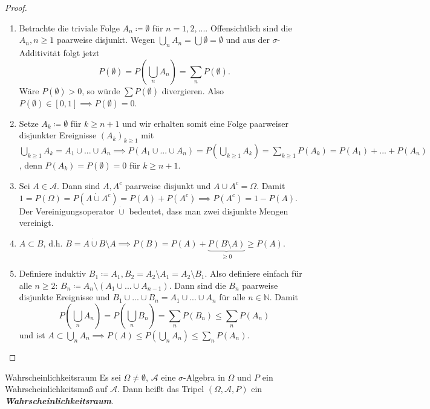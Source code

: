 \documentclass[a4paper, landscape,twocolumn,fontsize=9pt]{scrartcl}
\newcommand{\vip}[1]{\textit{\textbf{#1}}}
\begin{document}
\begin{proof}
\begin{enumerate}
	\item Betrachte die triviale Folge $A_n \coloneqq \emptyset$ für $n= 1,2,...$. Offensichtlich sind die $A_n, n \geq 1$ paarweise disjunkt. Wegen $\bigcup_n A_n = \bigcup \emptyset = \emptyset$ und aus der $\sigma$-Additivität folgt jetzt
\[
	P(\emptyset) = P(\bigcup_n A_n) = \sum_{n} P(\emptyset).
\]
Wäre $P(\emptyset) > 0$, so würde $\sum P(\emptyset)$ divergieren. Also $P(\emptyset) \in [0,1] \implies P(\emptyset) = 0$.

\item Setze $A_k \coloneqq \emptyset$ für $k \geq n + 1$ und wir erhalten somit eine Folge paarweiser disjunkter Ereignisse $(A_k)_{k \geq 1}$ mit $\bigcup_{k \geq 1}A_k = A_1 \cup ... \cup A_n \implies P(A_1 \cup ... \cup A_n) = P(\bigcup_{k \geq 1}A_k) = \sum_{k \geq 1}P(A_k) = P(A_1) + ... + P(A_n)$,  denn $P(A_k) = P(\emptyset) = 0$ für $k \geq n+1$.

\item Sei $A \in \mathcal A$. Dann sind $A,A^c$ paarweise disjunkt und $A \cup A^c = \Omega$. Damit $1 = P(\Omega) = P(A \dot \cup A^c) = P(A) + P(A^c) \implies P(A^c) = 1 - P(A)$. Der Vereinigungsoperator $\dot \cup$ bedeutet, dass man zwei disjunkte Mengen vereinigt.

\item $A \subset B$, d.h. $B = A \dot \cup B \setminus A \implies P(B) = P(A) + \underbrace{P(B \setminus A)}_{\geq 0} \geq P(A)$.


\item Definiere induktiv $B_1 \coloneqq A_1, B_2 = A_2 \setminus A_1 = A_2 \setminus B_1$. Also definiere einfach für alle $n \geq 2$: $B_n \coloneqq A_n \setminus (A_1 \cup ... \cup A_{n-1})$. Dann sind die $B_n$ paarweise disjunkte Ereignisse und $B_1 \cup ... \cup B_n = A_1 \cup ... \cup A_n$ für alle $n \in \mathbb N$. Damit
\[
	P(\bigcup_n A_n) = P(\bigcup_n B_n) = \sum_n P(B_n) \leq \sum_n P(A_n)
\]
und ist $A \subset \bigcup_n A_n \implies P(A) \leq P(\bigcup_n A_n) \leq \sum_n P(A_n)$.
\end{enumerate}
\end{proof}

\begin{definition}{Wahrscheinlichkeitsraum}{}
Es sei $\Omega \neq \emptyset$, $\mathcal A$ eine $\sigma$-Algebra in $\Omega$ und $P$ ein Wahrscheinlichkeitsmaß auf $\mathcal A$. Dann heißt das Tripel $(\Omega, \mathcal A, P)$ ein \vip{Wahrscheinlichkeitsraum}.
\end{definition}
\end{document}
